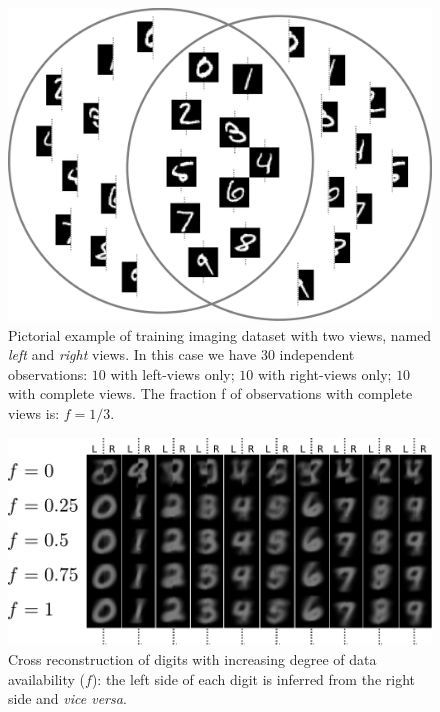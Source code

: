 \begin{figure}[!h]
\centering
\includegraphics[width=0.8\columnwidth]{./tex/fig/mnist_scheme.pdf}
\caption{
	Pictorial example of training imaging dataset with two views, named \textit{left} and \textit{right} views.
	In this case we have 30 independent observations:
	$10$ with left-views only; $10$ with right-views only; $10$ with complete views.
	The fraction f of observations with complete views is:
	$f = 1/3$.
}
\label{fig:mnist_scheme}
\end{figure}
%
\begin{figure}[!h]
\centering
\includegraphics[width=0.8\columnwidth]{./tex/fig/mnist_half.pdf}
\caption{
	Cross reconstruction of digits with increasing degree of data availability ($f$):
	the left side of each digit is inferred from the right side and \textit{vice versa}.
}
\label{fig:mnist_half}
\end{figure}
